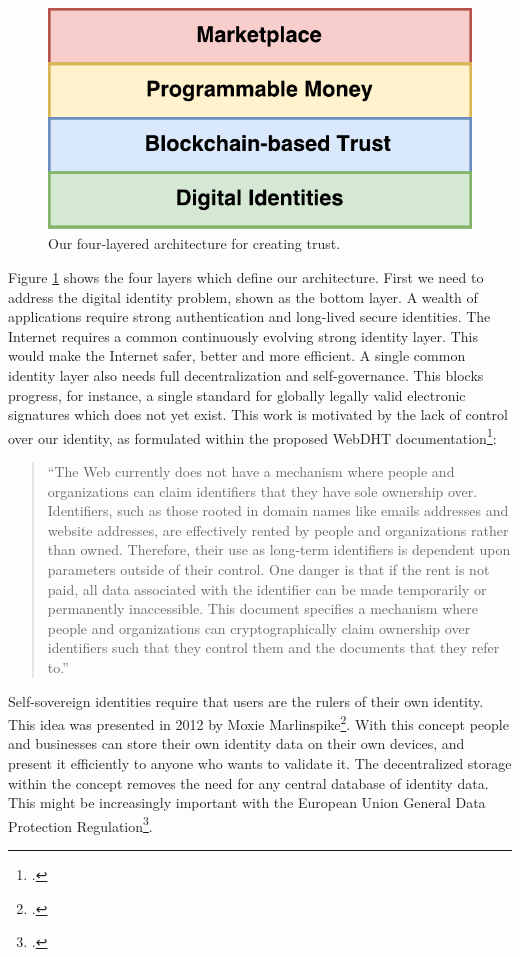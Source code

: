 \documentclass[USenglish]{article}
\begin{document}
\begin{figure}[t]
	\centering
	\includegraphics[width=1\columnwidth]{assets/tech_stack_simple}
	\caption{Our four-layered architecture for creating trust.}
	\label{fig:tech_stack_simple}
\end{figure}

Figure \ref{fig:tech_stack_simple} shows the four layers which define our architecture.
First we need to address the digital identity problem, shown as the bottom layer.
A wealth of applications require strong authentication and long-lived secure identities.
The Internet requires a common continuously evolving strong identity layer.
This would make the Internet safer, better and more efficient.
A single common identity layer also needs full decentralization and self-governance.
This blocks progress, for instance, a single standard for globally legally valid electronic signatures which does not yet exist.
This work is motivated by the lack of control over our identity, as formulated within the proposed WebDHT documentation\footcite{webdhtproposal}: 

\blockquote{\enquote{The Web currently does not have a mechanism where people and organizations can claim identifiers that they have sole ownership over. Identifiers, such as those rooted in domain names like emails addresses and website addresses, are effectively rented by people and organizations rather than owned. Therefore, their use as long-term identifiers is dependent upon parameters outside of their control. One danger is that if the rent is not paid, all data associated with the identifier can be made temporarily or permanently inaccessible. This document specifies a mechanism where people and organizations can cryptographically claim ownership over identifiers such that they control them and the documents that they refer to.}}

Self-sovereign identities require that users are the rulers of their own identity.
This idea was presented in 2012 by Moxie Marlinspike\footcite{sovereignsource}.
With this concept people and businesses can store their own identity data on their own devices, and present it efficiently to anyone who wants to validate it.
The decentralized storage within the concept removes the need for any central database of identity data.
This might be increasingly important with the European Union General Data Protection Regulation\footcite{dataportabilityeu}.
\end{document}
